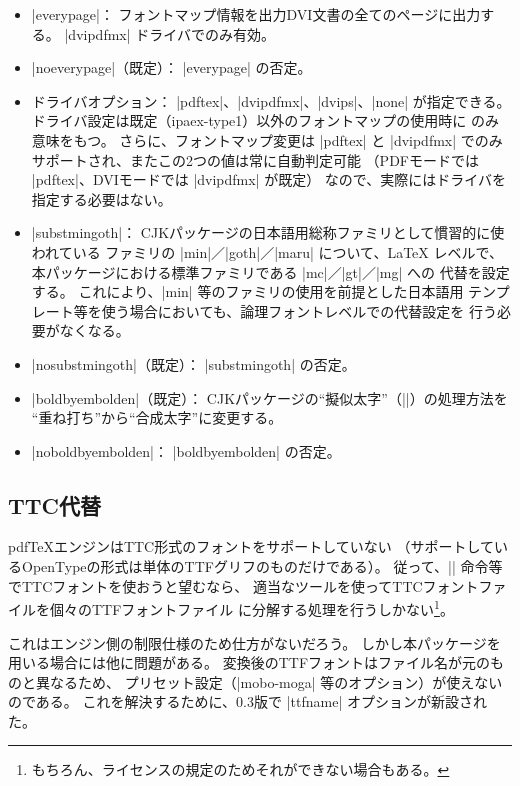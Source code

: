 \documentclass[a4paper]{ltjsarticle}
\newcommand{\Pkg}[1]{\textsf{#1}}
\newcommand{\Means}{：\quad}
\providecommand{\pdfTeX}{pdf\/\TeX}
\begin{document}
\begin{itemize}
\item |everypage|\Means
  フォントマップ情報を出力DVI文書の全てのページに出力する。
  |dvipdfmx| ドライバでのみ有効。
\item |noeverypage|（既定）\Means
  |everypage| の否定。
\item ドライバオプション\Means
  |pdftex|、|dvipdfmx|、|dvips|、|none| が指定できる。
  ドライバ設定は既定（ipaex-type1）以外のフォントマップの使用時に
  のみ意味をもつ。
  さらに、フォントマップ変更は |pdftex| と |dvipdfmx| でのみ
  サポートされ、またこの2つの値は常に自動判定可能
  （PDFモードでは |pdftex|、DVIモードでは |dvipdfmx| が既定）
  なので、実際にはドライバを指定する必要はない。
\item |substmingoth|\Means
  CJKパッケージの日本語用総称ファミリとして慣習的に使われている
  ファミリの |min|／|goth|／|maru| について、{\LaTeX} レベルで、
  本パッケージにおける標準ファミリである |mc|／|gt|／|mg| への
  代替を設定する。
  これにより、|min| 等のファミリの使用を前提とした日本語用
  テンプレート等を使う場合においても、論理フォントレベルでの代替設定を
  行う必要がなくなる。
\item |nosubstmingoth|（既定）\Means
  |substmingoth| の否定。
\item |boldbyembolden|（既定）\Means
  \Pkg{CJK}パッケージの“擬似太字”（|\CJKbold|）の処理方法を
  “重ね打ち”から“合成太字”に変更する。
\item |noboldbyembolden|\Means
  |boldbyembolden| の否定。
\end{itemize}

\subsection{TTC代替}
\label{ssec:ttfname}

{\pdfTeX}エンジンはTTC形式のフォントをサポートしていない
（サポートしているOpenTypeの形式は単体のTTFグリフのものだけである）。
従って、|\setminchofont| 命令等でTTCフォントを使おうと望むなら、
適当なツールを使ってTTCフォントファイルを個々のTTFフォントファイル
に分解する処理を行うしかない\footnote{%
もちろん、ライセンスの規定のためそれができない場合もある。}。

これはエンジン側の制限仕様のため仕方がないだろう。
しかし本パッケージを用いる場合には他に問題がある。
変換後のTTFフォントはファイル名が元のものと異なるため、
プリセット設定（|mobo-moga| 等のオプション）が使えないのである。
これを解決するために、0.3版で |ttfname| オプションが新設された。
\end{document}
